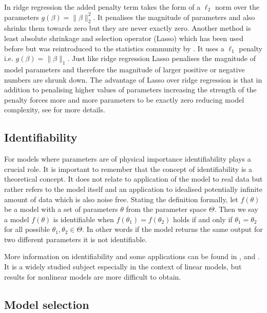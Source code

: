 In ridge regression the added penalty term takes the form of a $\ell_2$ norm over the parameters $g(\beta) = \lVert \beta \rVert_2^2$. It penalises the magnitude of parameters and also shrinks them towards zero but they are never exactly zero. Another method is least absolute shrinkage and selection operator (Lasso) which has been used before but was reintroduced to the statistics community by \cite{Tibshirani:1996wba}. It uses a $\ell_1$ penalty i.e. $g(\beta) = \lVert \beta \rVert_1$. Just like ridge regression Lasso penalises the magnitude of model parameters and therefore the magnitude of larger positive or negative numbers are shrunk down. The advantage of Lasso over ridge regression is that in addition to penalising higher values of parameters increasing the strength of the penalty forces more and more parameters to be exactly zero reducing model complexity, see \cite{hastie2001elements} for more details.

\subsection{Identifiability}
\label{sec:identifiability-back}

For models where parameters are of physical importance identifiability plays a crucial role. It is important to remember that the concept of identifiability is a theoretical concept. It does not relate to application of the model to real data but rather refers to the model itself and an application to idealised potentially infinite amount of data which is also noise free. Stating the definition formally, let $f(\theta)$ be a model with a set of parameters $\theta$ from the parameter space $\Theta$. Then we say a model $f(\theta)$ is identifiable when $f(\theta_1) = f(\theta_2)$ holds if and only if $\theta_1 = \theta_2$ for all possible $\theta_1, \theta_2 \in \Theta$. In other words if the model returns the same output for two different parameters it is not identifiable.

More information on identifiability and some applications can be found in \cite{Saccomani:2003kx},  \cite{Saccomani:2010by} and \cite{Jacquez:1985fz}. It is a widely studied subject especially in the context of linear models, but results for nonlinear models are more difficult to obtain.

\subsection{Model selection}
\label{sec:model-selection-1}

